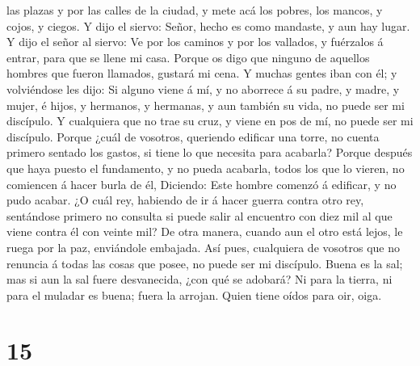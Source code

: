 las plazas y por las calles de la ciudad, y mete acá los pobres, los
mancos, y cojos, y ciegos.  Y dijo el siervo: Señor, hecho
es como mandaste, y aun hay lugar.  Y dijo el señor al
siervo: Ve por los caminos y por los vallados, y fuérzalos á entrar,
para que se llene mi casa.  Porque os digo que ninguno de
aquellos hombres que fueron llamados, gustará mi cena.  Y
muchas gentes iban con él; y volviéndose les dijo:  Si
alguno viene á mí, y no aborrece á su padre, y madre, y mujer, é hijos,
y hermanos, y hermanas, y aun también su vida, no puede ser mi
discípulo.  Y cualquiera que no trae su cruz, y viene en
pos de mí, no puede ser mi discípulo.  Porque ¿cuál de
vosotros, queriendo edificar una torre, no cuenta primero sentado los
gastos, si tiene lo que necesita para acabarla?  Porque
después que haya puesto el fundamento, y no pueda acabarla, todos los
que lo vieren, no comiencen á hacer burla de él,  Diciendo:
Este hombre comenzó á edificar, y no pudo acabar.  ¿O cuál
rey, habiendo de ir á hacer guerra contra otro rey, sentándose primero
no consulta si puede salir al encuentro con diez mil al que viene contra
él con veinte mil?  De otra manera, cuando aun el otro está
lejos, le ruega por la paz, enviándole embajada.  Así pues,
cualquiera de vosotros que no renuncia á todas las cosas que posee, no
puede ser mi discípulo.  Buena es la sal; mas si aun la sal
fuere desvanecida, ¿con qué se adobará?  Ni para la tierra,
ni para el muladar es buena; fuera la arrojan. Quien tiene oídos para
oir, oiga.

\hypertarget{section-14}{%
\section{15}\label{section-14}}

